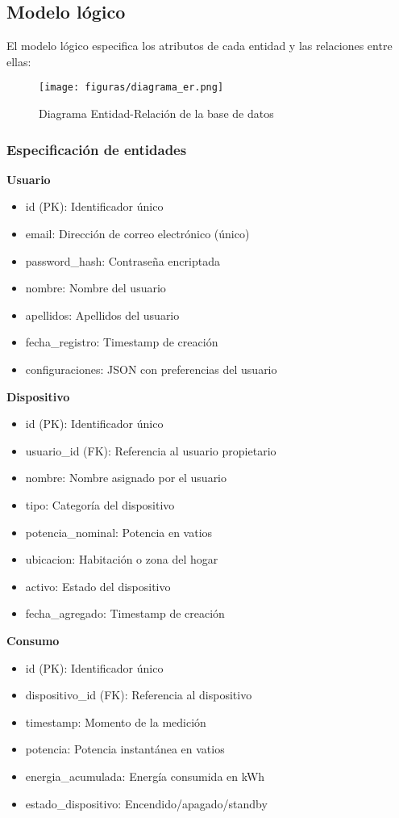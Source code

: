 \subsection{Modelo lógico}

El modelo lógico especifica los atributos de cada entidad y las relaciones entre ellas:

\begin{figure}[H]
    \centering
    \texttt{[image: figuras/diagrama\_er.png]}
    \caption{Diagrama Entidad-Relación de la base de datos}
    \label{fig:diagrama_er}
\end{figure}

\subsubsection{Especificación de entidades}

\textbf{Usuario}
\begin{itemize}
    \item id (PK): Identificador único
    \item email: Dirección de correo electrónico (único)
    \item password\_hash: Contraseña encriptada
    \item nombre: Nombre del usuario
    \item apellidos: Apellidos del usuario
    \item fecha\_registro: Timestamp de creación
    \item configuraciones: JSON con preferencias del usuario
\end{itemize}

\textbf{Dispositivo}
\begin{itemize}
    \item id (PK): Identificador único
    \item usuario\_id (FK): Referencia al usuario propietario
    \item nombre: Nombre asignado por el usuario
    \item tipo: Categoría del dispositivo
    \item potencia\_nominal: Potencia en vatios
    \item ubicacion: Habitación o zona del hogar
    \item activo: Estado del dispositivo
    \item fecha\_agregado: Timestamp de creación
\end{itemize}

\textbf{Consumo}
\begin{itemize}
    \item id (PK): Identificador único
    \item dispositivo\_id (FK): Referencia al dispositivo
    \item timestamp: Momento de la medición
    \item potencia: Potencia instantánea en vatios
    \item energia\_acumulada: Energía consumida en kWh
    \item estado\_dispositivo: Encendido/apagado/standby
\end{itemize}


